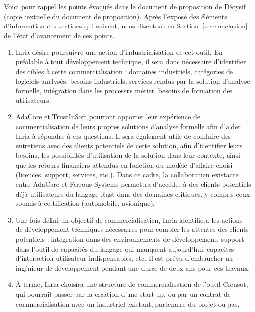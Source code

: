 \documentclass[a4paper,11pt]{article}
\begin{document}
Voici pour rappel les points évoqués dans le document de proposition de Décysif
(copie textuelle du document de proposition). Après l'exposé des éléments
d'information des sections qui suivent, nous discutons en
Section~\ref{sec:conclusion} de l'état d'avancement de ces points.

\begin{enumerate}
\item Inria désire poursuivre une action d’industrialisation de cet outil. En
  préalable à tout développement technique, il sera donc nécessaire d’identifier
  des cibles à cette commercialisation : domaines industriels, catégories de
  logiciels analysés, besoins industriels, services rendus par la solution
  d’analyse formelle, intégration dans les processus métier, besoins de
  formation des utilisateurs.

\item AdaCore et TrustInSoft pourront apporter leur expérience de commercialisation
  de leurs propres solutions d’analyse formelle afin d’aider Inria à répondre à
  ces questions. Il sera également utile de conduire des entretiens avec des
  clients potentiels de cette solution, afin d’identifier leurs besoins, les
  possibilités d’utilisation de la solution dans leur contexte, ainsi que les
  retours financiers attendus en fonction du modèle d’affaire choisi (licences,
  support, services, etc.). Dans ce cadre, la collaboration existante entre
  AdaCore et Ferrous Systems permettra d’accéder à des clients potentiels déjà
  utilisateurs du langage Rust dans des domaines critiques, y compris ceux
  soumis à certification (automobile, avionique).

\item Une fois défini un objectif de commercialisation, Inria identifiera les
  actions de développement techniques nécessaires pour combler les attentes des
  clients potentiels : intégration dans des environnements de développement,
  support dans l’outil de capacités du langage qui manquent aujourd’hui,
  capacités d’interaction utilisateur indispensables, etc. Il est prévu
  d’embaucher un ingénieur de développement pendant une durée de deux ans pour
  ces travaux.

\item À terme, Inria choisira une structure de commercialisation de l’outil Creusot,
  qui pourrait passer par la création d’une start-up, ou par un contrat de
  commercialisation avec un industriel existant, partenaire du projet ou pas.


\end{enumerate}
\end{document}

